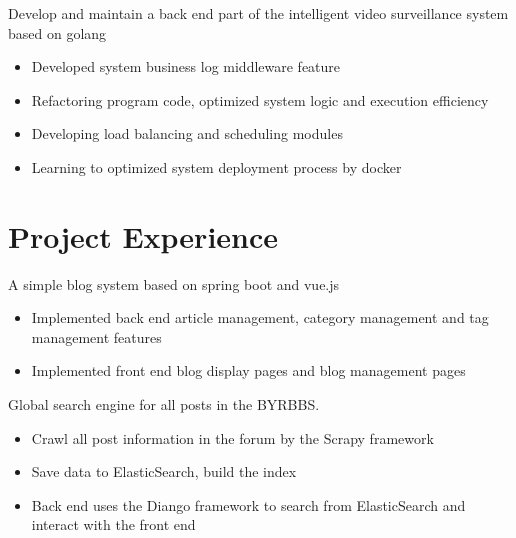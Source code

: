 \documentclass{resume}
\begin{document}
Develop and maintain a back end part of the intelligent video surveillance system based on golang
\begin{itemize}
  \item Developed system business log middleware feature
  \item Refactoring program code, optimized system logic and execution efficiency
  \item Developing load balancing and scheduling modules
  \item Learning to optimized system deployment process by docker
\end{itemize}

\section{Project Experience}

A simple blog system based on spring boot and vue.js
\begin{itemize}
  \item Implemented back end article management, category management and tag management features
  \item Implemented front end blog display pages and blog management pages 
\end{itemize}

Global search engine for all posts in the BYRBBS.
\begin{itemize}
  \item Crawl all post information in the forum by the Scrapy framework
  \item Save data to ElasticSearch, build the index
  \item Back end uses the Diango framework to search from ElasticSearch and interact with the front end
\end{itemize}
\end{document}
